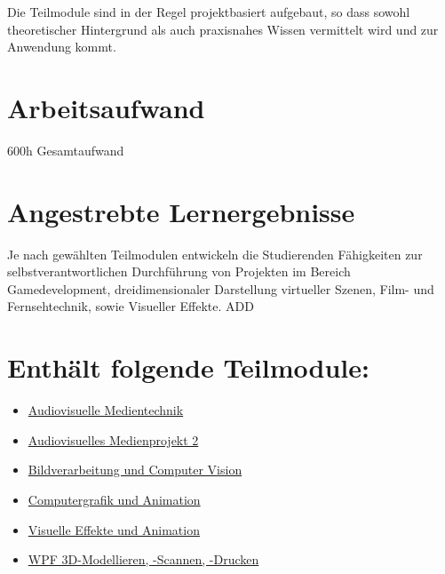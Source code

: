 Die Teilmodule sind in der Regel projektbasiert aufgebaut, so dass
sowohl theoretischer Hintergrund als auch praxisnahes Wissen vermittelt
wird und zur Anwendung kommt.

\hypertarget{arbeitsaufwandpathlabelmi-2017modulbeschreibungen-bachelorba_vertiefung-visual-computing}{%
\section*{Arbeitsaufwand\label{/mi-2017/modulbeschreibungen-bachelor/BA_Vertiefung-Visual-Computing}}\label{arbeitsaufwandpathlabelmi-2017modulbeschreibungen-bachelorba_vertiefung-visual-computing}}

600h Gesamtaufwand

\hypertarget{angestrebte-lernergebnissepathlabelmi-2017modulbeschreibungen-bachelorba_vertiefung-visual-computing}{%
\section*{Angestrebte
Lernergebnisse\label{/mi-2017/modulbeschreibungen-bachelor/BA_Vertiefung-Visual-Computing}}\label{angestrebte-lernergebnissepathlabelmi-2017modulbeschreibungen-bachelorba_vertiefung-visual-computing}}

Je nach gewählten Teilmodulen entwickeln die Studierenden Fähigkeiten
zur selbstverantwortlichen Durchführung von Projekten im Bereich
Gamedevelopment, dreidimensionaler Darstellung virtueller Szenen, Film-
und Fernsehtechnik, sowie Visueller Effekte. ADD

\hypertarget{enthuxe4lt-folgende-teilmodulepathlabelmi-2017modulbeschreibungen-bachelorba_vertiefung-visual-computing}{%
\section*{Enthält folgende
Teilmodule:\label{/mi-2017/modulbeschreibungen-bachelor/BA_Vertiefung-Visual-Computing}}\label{enthuxe4lt-folgende-teilmodulepathlabelmi-2017modulbeschreibungen-bachelorba_vertiefung-visual-computing}}

\begin{itemize}
\tightlist
\item
  \hyperref[/mi-2017/modulbeschreibungen-bachelor/BA_VC-audiovisuelle-medientechnik]{Audiovisuelle Medientechnik}
\item
  \hyperref[/mi-2017/modulbeschreibungen-bachelor/BA_VC-audiovisuelles-medienprojekt-2]{Audiovisuelles Medienprojekt 2}
\item
  \hyperref[/mi-2017/modulbeschreibungen-bachelor/BA_VC-bildverarbeitung-und-computer-vision]{Bildverarbeitung und Computer Vision}
\item
  \hyperref[/mi-2017/modulbeschreibungen-bachelor/BA_VC-computergrafik-und-animation]{Computergrafik und Animation}
\item
  \hyperref[/mi-2017/modulbeschreibungen-bachelor/BA_VC-visuelle-effekte-und-animation]{Visuelle Effekte und Animation}
\item
  \hyperref[/mi-2017/modulbeschreibungen-bachelor/BA_WPF-3D-MSD]{WPF 3D-Modellieren, -Scannen, -Drucken}
\end{itemize}

